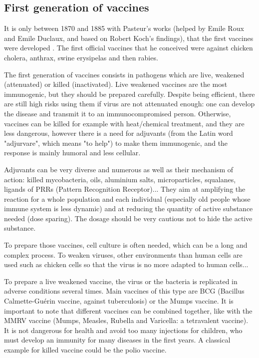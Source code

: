 \documentclass{article}
\begin{document}
        \subsection{First generation of vaccines}
            
            It is only between 1870 and 1885 with Pasteur's works (helped by Emile Roux and Emile Duclaux, and based on Robert Koch's findings), 
                that the first vaccines were developed \autocite{plotkinHistoryVaccination2014}.
            The first official vaccines that he conceived were against chicken cholera, anthrax, swine erysipelas and then rabies.

            The first generation of vaccines consists in pathogens which are live, weakened (attenuated) or killed (inactivated). Live weakened vaccines are the most immunogenic,
                but they should be prepared carefully. Despite being efficient, there are still high risks using them if virus are not attenuated enough:
                one can develop the disease and transmit it to an immunocompromised person. Otherwise, vaccines can be killed for example with heat/chemical treatment, and they
                are less dangerous, however there is a need for adjuvants (from the Latin word "adjurvare", which means "to help") 
                to make them immunogenic, and the response is mainly humoral and less cellular.

            Adjuvants can be very diverse and numerous as well as their mechanism of action: killed mycobacteria, oils, 
                aluminium salts, microparticles, squalanes, ligands of 
                PRRs (Pattern Recognition Receptor)... 
                They aim at amplifying the reaction for a whole population and each individual (especially old people whose immune system is less dynamic) and 
                at reducing the quantity of active substance needed (dose sparing). The dosage should be very cautious not to hide the active substance.
                
            To prepare those vaccines, cell culture is often needed, which can be a long and complex process.
            To weaken viruses, other environments than human cells are used such as chicken cells so that the virus is no more adapted to human cells...

            To prepare a live weakened vaccine, the virus or the bacteria is replicated in adverse conditions several times. Main vaccines of this type are BCG
            (Bacillus Calmette-Guérin vaccine, against tuberculosis) or the Mumps vaccine. It is important to note that different vaccines can be combined together,
            like with the MMRV vaccine (Mumps, Measles, Rubella and Varicella: a tetravalent vaccine). It is not dangerous for health and avoid too many injections for children,
            who must develop an immunity for many diseases in the first years. A classical example for killed vaccine could be the polio vaccine.  
                       
\end{document}
